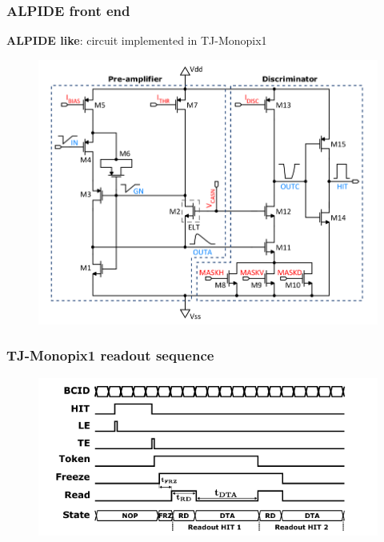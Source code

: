     \begin{frame}[noframenumbering]
        \frametitle{ALPIDE front end}
            \textbf{ALPIDE like}: circuit implemented in TJ-Monopix1
            \begin{figure}[h!]
                \centering
                \includegraphics[width=.8\linewidth]{figures/Monopix1/Monopix1_FE_circuit.png}        
            \end{figure}
    \end{frame}     

    \begin{frame}[noframenumbering]
        \frametitle{TJ-Monopix1 readout sequence}
        \begin{figure}[h!]
            \centering
            \includegraphics[width=.8\linewidth]{figures/Monopix1/readout_timing.png}
        \end{figure}
    \end{frame} 

